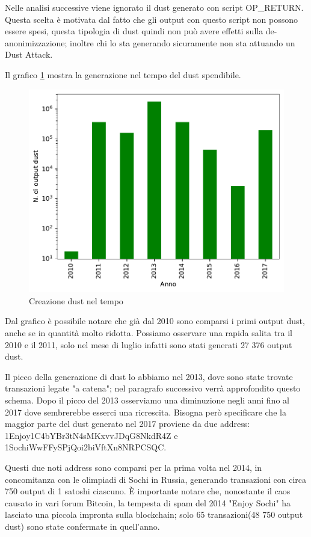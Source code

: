 Nelle analisi successive viene ignorato il dust generato con script OP\_RETURN. Questa scelta è motivata dal fatto che gli output con questo script non possono essere spesi, questa tipologia di dust quindi non può avere effetti sulla de-anonimizzazione; inoltre chi lo sta generando sicuramente non sta attuando un Dust Attack.

Il grafico \ref{fig:dust_created} mostra la generazione nel tempo del dust spendibile.
\begin{figure}[h!]
    \centering
    \includegraphics[scale=0.9]{Grafici/dust_created_year.pdf}
    \caption{Creazione dust nel tempo}
    \label{fig:dust_created}
\end{figure}
\FloatBarrier 
Dal grafico è possibile notare che già dal 2010 sono comparsi i primi output dust, anche se in quantità molto ridotta. Possiamo osservare una rapida salita tra il 2010 e il 2011, solo nel mese di luglio infatti sono stati generati 27 376 output dust.

Il picco della generazione di dust lo abbiamo nel 2013, dove sono state trovate transazioni legate "a catena"; nel paragrafo successivo verrà approfondito questo schema. Dopo il picco del 2013 osserviamo una diminuzione negli anni fino al 2017 dove sembrerebbe esserci una ricrescita. Bisogna però specificare che la maggior parte del dust generato nel 2017 proviene da due address: 1Enjoy1C4bYBr3tN4sMKxvvJDqG8NkdR4Z e 1SochiWwFFySPjQoi2biVftXn8NRPCSQC.

Questi due noti address sono comparsi per la prima volta nel 2014, in concomitanza con le olimpiadi di Sochi in Russia, generando transazioni con circa 750 output di 1 satoshi ciascuno. È importante notare che, nonostante il caos causato in vari forum Bitcoin, la tempesta di spam del 2014 "Enjoy Sochi" ha lasciato una piccola impronta sulla blockchain; solo 65 transazioni(48 750 output dust) sono state confermate in quell'anno.


